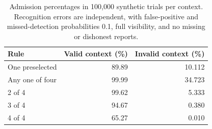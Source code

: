 \begin{table}[htbp]
    \centering
    \caption{Admission percentages in 100,000 synthetic trials per context. Recognition errors are independent, with false-positive and missed-detection probabilities 0.1, full visibility, and no missing or dishonest reports.}
    \label{tab:capture-sensitivity-reference}
    \begin{tabular}{lrr}
        \toprule
        \textbf{Rule} & \textbf{Valid context (\%)} & \textbf{Invalid context (\%)} \\
        \midrule
        One preselected & 89.89 & 10.112 \\
        Any one of four & 99.99 & 34.723 \\
        2 of 4 & 99.62 & 5.333 \\
        3 of 4 & 94.67 & 0.380 \\
        4 of 4 & 65.27 & 0.010 \\
        \bottomrule
    \end{tabular}
\end{table}
